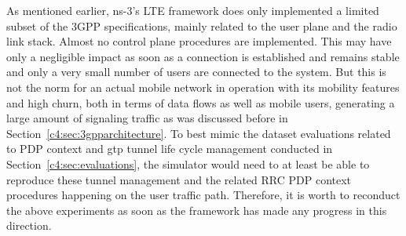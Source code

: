 As mentioned earlier, ns-3's \gls{LTE} framework does only implemented a limited subset of the \gls{3GPP} specifications, mainly related to the user plane and the radio link stack. Almost no control plane procedures are implemented. This may have only a negligible impact as soon as a connection is established and remains stable and only a very small number of users are connected to the system. But this is not the norm for an actual mobile network in operation with its mobility features and high churn, both in terms of data flows as well as mobile users, generating a large amount of signaling traffic as was discussed before in Section~\ref{c4:sec:3gpparchitecture}. To best mimic the dataset evaluations related to \gls{PDP} context and \gls{gtp} tunnel life cycle management conducted in Section~\ref{c4:sec:evaluations}, the simulator would need to at least be able to reproduce these tunnel management and the related \gls{RRC} \gls{PDP} context procedures happening on the user traffic path. Therefore, it is worth to reconduct the above experiments as soon as the framework has made any progress in this direction.













